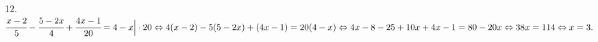 12. $\cfrac{x-2}{5}-\cfrac{5-2x}{4}+\cfrac{4x-1}{20}=4-x\Big|\cdot20\Leftrightarrow4(x-2)-5(5-2x)+(4x-1)=20(4-x)\Leftrightarrow
4x-8-25+10x+4x-1=80-20x\Leftrightarrow38x=114\Leftrightarrow x=3.$\\
